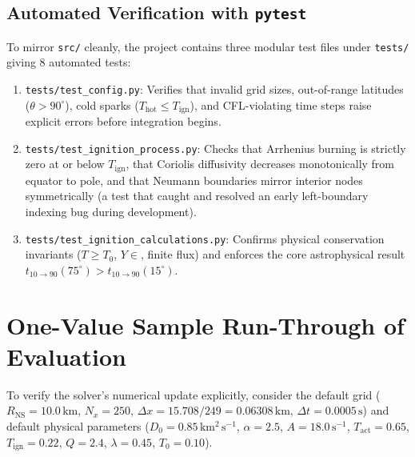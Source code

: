 \documentclass[11pt,a4paper]{article}
\begin{document}
\subsection{Automated Verification with \texttt{pytest}}
To mirror \texttt{src/} cleanly, the project contains three modular test files under \texttt{tests/} giving 8 automated tests:
\begin{enumerate}
    \item \texttt{tests/test\_config.py}: Verifies that invalid grid sizes, out-of-range latitudes ($\theta > 90^\circ$), cold sparks ($T_{\mathrm{hot}} \le T_{\mathrm{ign}}$), and CFL-violating time steps raise explicit errors before integration begins.
    \item \texttt{tests/test\_ignition\_process.py}: Checks that Arrhenius burning is strictly zero at or below $T_{\mathrm{ign}}$, that Coriolis diffusivity decreases monotonically from equator to pole, and that Neumann boundaries mirror interior nodes symmetrically (a test that caught and resolved an early left-boundary indexing bug during development).
    \item \texttt{tests/test\_ignition\_calculations.py}: Confirms physical conservation invariants ($T \ge T_0$, $Y \in$, finite flux) and enforces the core astrophysical result $t_{10 \to 90}(75^\circ) > t_{10 \to 90}(15^\circ)$.
\end{enumerate}

\section{One-Value Sample Run-Through of Evaluation}

To verify the solver's numerical update explicitly, consider the default grid ($R_{\mathrm{NS}} = 10.0\,\mathrm{km}$, $N_x = 250$, $\Delta x = 15.708 / 249 = 0.06308\,\mathrm{km}$, $\Delta t = 0.0005\,\mathrm{s}$) and default physical parameters ($D_0 = 0.85\,\mathrm{km^2\,s^{-1}}$, $\alpha = 2.5$, $A = 18.0\,\mathrm{s^{-1}}$, $T_{\mathrm{act}} = 0.65$, $T_{\mathrm{ign}} = 0.22$, $Q = 2.4$, $\lambda = 0.45$, $T_0 = 0.10$).
\end{document}
